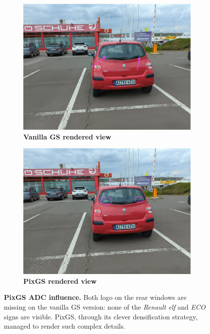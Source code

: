 \begin{figure}[htb!]
  \centering
  \begin{subfigure}[b]{0.45\linewidth}
    \includegraphics[width=\linewidth]{images/gaussiansplatting/00029-gs.png}
    \caption{\textbf{Vanilla GS rendered view}}
    \label{fig:view3}
  \end{subfigure}
  \quad %
  \begin{subfigure}[b]{0.45\linewidth}
    \includegraphics[width=\linewidth]{images/gaussiansplatting/00029-pixgs.png}
    \caption{\textbf{PixGS rendered view}}
    \label{fig:gs-view3-gs}
  \end{subfigure}
  \caption{\textbf{PixGS ADC influence.} Both logo on the rear windows are missing on the vanilla \ac{GS} version: none of the \textit{Renault elf} and \textit{ECO} signs are visible. PixGS, through its clever densification strategy, managed to render such complex details.}
  \label{fig:gs-pigs}
\end{figure}

